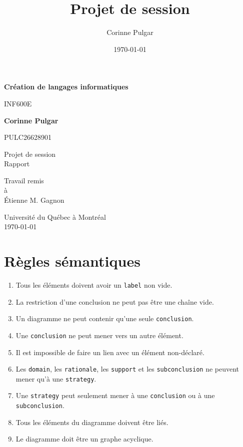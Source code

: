 \documentclass[fleqn]{article}
\title{Projet de session}
\author{Corinne Pulgar}
\date{\today}
\begin{document}
    \begin{titlepage}
    \begin{center}
        \vspace*{2cm}
    
        \textbf{Création de langages informatiques}
    
            INF600E
    
        \vspace{2cm}
    
        \textbf{Corinne Pulgar}
    
            PULC26628901

        \vspace{2cm}
    
            Projet de session\\
            Rapport
            
        \vspace{2cm}
    
            Travail remis\\
            à\\
            Étienne M. Gagnon
        
        \vfill
    
        Université du Québec à Montréal\\
        \today
    
        \vspace*{2cm}
    \end{center}
    \end{titlepage}
    
    \thispagestyle{empty}
    \clearpage
    \setcounter{page}{1}

    \section*{Règles sémantiques}
    \begin{enumerate}
        \item Tous les éléments doivent avoir un \verb'label' non vide.
        \item La restriction d'une conclusion ne peut pas être une chaîne vide.
        \item Un diagramme ne peut contenir qu'une seule \verb'conclusion'.
        \item Une \verb'conclusion' ne peut mener vers un autre élément.
        \item Il est impossible de faire un lien avec un élément non-déclaré.
        \item Les \verb'domain', les \verb'rationale', les \verb'support' et les \verb'subconclusion' ne peuvent mener qu'à une \verb'strategy'.
        \item Une \verb'strategy' peut seulement mener à une \verb'conclusion' ou à une \\ \verb'subconclusion'.
        \item Tous les éléments du diagramme doivent être liés.
        \item Le diagramme doit être un graphe acyclique.
    \end{enumerate}
\end{document}
